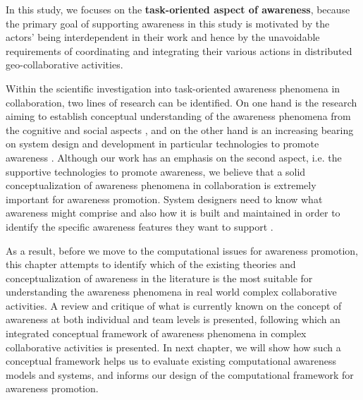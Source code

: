 In this study, we focuses on the \textbf{task-oriented aspect of awareness}, because the primary goal of supporting awareness in this study is motivated by the actors' being interdependent in their work and hence by the unavoidable requirements of coordinating and integrating their various actions in distributed geo-collaborative activities.

Within the scientific investigation into task-oriented awareness phenomena in collaboration, two lines of research can be identified. On one hand is the research aiming to establish conceptual understanding of the awareness phenomena from the cognitive and social aspects \cite{Salmon2008}, and on the other hand is an increasing bearing on system design and development in particular technologies to promote awareness \cite{rittenbruch2009a}. Although our work has an emphasis on the second aspect, i.e. the supportive technologies to promote awareness, we believe that a solid conceptualization of awareness phenomena in collaboration is extremely important for awareness promotion. System designers need to know what awareness might comprise and also how it is built and maintained in order to identify the specific awareness features they want to support \cite{Stanton2006}. 

As a result, before we move to the computational issues for awareness promotion, this chapter attempts to identify which of the existing theories and conceptualization of awareness in the literature is the most suitable for understanding the awareness phenomena in real world complex collaborative activities. A review and critique of what is currently known on the concept of awareness at both individual and team levels is presented, following which an integrated conceptual framework of awareness phenomena in complex collaborative activities is presented. In next chapter, we will show how such a conceptual framework helps us to evaluate existing computational awareness models and systems, and informs our design of the computational framework for awareness promotion.

